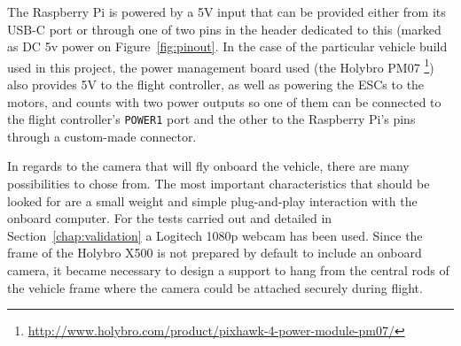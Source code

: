 The Raspberry Pi is powered by a 5V input that can be provided either from its USB-C port or through one of two pins in the header dedicated to this (marked as DC 5v power on Figure~\ref{fig:pinout}.
In the case of the particular vehicle build used in this project, the power management board used (the Holybro PM07 \footnote{\url{http://www.holybro.com/product/pixhawk-4-power-module-pm07/}}) also provides 5V to the flight controller, as well as powering the ESCs to the motors, and counts with two power outputs so one of them can be connected to the flight controller's \verb|POWER1| port and the other to the Raspberry Pi's pins through a custom-made connector.

In regards to the camera that will fly onboard the vehicle, there are many possibilities to chose from.
The most important characteristics that should be looked for are a small weight and simple plug-and-play interaction with the onboard computer.
For the tests carried out and detailed in Section~\ref{chap:validation} a Logitech 1080p webcam  has been used.
Since the frame of the Holybro X500 is not prepared by default to include an onboard camera, it became necessary to design a support to hang from the central rods of the vehicle frame where the camera could be attached securely during flight.

